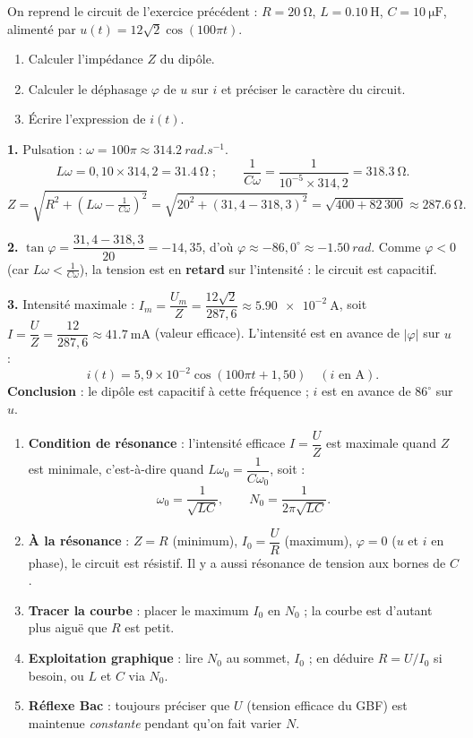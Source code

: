 \documentclass[11pt]{article}
\newcommand{\cle}[1]{{\popxbold\color{popdark}#1}}
\begin{document}
\begin{exoresolu}
On reprend le circuit de l'exercice précédent : $R = \SI{20}{\ohm}$, $L = \SI{0,10}{\henry}$, $C = \SI{10}{\micro\farad}$, alimenté par $u(t) = 12\sqrt{2}\cos(100\pi t)$.
\begin{enumerate}
\item Calculer l'impédance $Z$ du dipôle.
\item Calculer le déphasage $\varphi$ de $u$ sur $i$ et préciser le caractère du circuit.
\item Écrire l'expression de $i(t)$.
\end{enumerate}
\tcblower
\textbf{1.} Pulsation : $\omega = 100\pi \approx \SI{314,2}{rad.s^{-1}}$.
\[ L\omega = 0{,}10 \times 314{,}2 = \SI{31,4}{\ohm} \; ; \qquad \dfrac{1}{C\omega} = \dfrac{1}{10^{-5}\times 314{,}2} = \SI{318,3}{\ohm}. \]
\[ Z = \sqrt{R^2 + \left(L\omega - \tfrac{1}{C\omega}\right)^2} = \sqrt{20^2 + (31{,}4 - 318{,}3)^2} = \sqrt{400 + 82\,300} \approx \SI{287,6}{\ohm}. \]

\textbf{2.} $\tan\varphi = \dfrac{31{,}4 - 318{,}3}{20} = -14{,}35$, d'où $\varphi \approx -86{,}0^{\circ} \approx \SI{-1,50}{rad}$.
Comme $\varphi < 0$ (car $L\omega < \tfrac{1}{C\omega}$), la tension est en \textbf{retard} sur l'intensité : le circuit est \cle{capacitif}.

\textbf{3.} Intensité maximale : $I_m = \dfrac{U_m}{Z} = \dfrac{12\sqrt{2}}{287{,}6} \approx \SI{5,90e-2}{\ampere}$, soit $I = \dfrac{U}{Z} = \dfrac{12}{287{,}6} \approx \SI{41,7}{\milli\ampere}$ (valeur efficace).
L'intensité est en avance de $|\varphi|$ sur $u$ :
\[ i(t) = 5{,}9\times 10^{-2}\cos\left(100\pi t + 1{,}50\right) \quad (i \text{ en A}). \]
\textbf{Conclusion} : le dipôle est capacitif à cette fréquence ; $i$ est en avance de $86^{\circ}$ sur $u$.
\end{exoresolu}

\begin{methode}[Étudier la résonance d'intensité et exploiter la courbe $I = f(N)$]
\begin{enumerate}
\item \textbf{Condition de résonance} : l'intensité efficace $I = \dfrac{U}{Z}$ est maximale quand $Z$ est minimale, c'est-à-dire quand $L\omega_0 = \dfrac{1}{C\omega_0}$, soit :
\[ \omega_0 = \dfrac{1}{\sqrt{LC}}, \qquad N_0 = \dfrac{1}{2\pi\sqrt{LC}}. \]
\item \textbf{À la résonance} : $Z = R$ (minimum), $I_0 = \dfrac{U}{R}$ (maximum), $\varphi = 0$ ($u$ et $i$ en phase), le circuit est résistif. Il y a aussi résonance de tension aux bornes de $C$.
\item \textbf{Tracer la courbe} : placer le maximum $I_0$ en $N_0$ ; la courbe est d'autant plus aiguë que $R$ est petit.
\item \textbf{Exploitation graphique} : lire $N_0$ au sommet, $I_0$ ; en déduire $R = U/I_0$ si besoin, ou $L$ et $C$ via $N_0$.
\item \textbf{Réflexe Bac} : toujours préciser que $U$ (tension efficace du GBF) est maintenue \emph{constante} pendant qu'on fait varier $N$.
\end{enumerate}
\end{methode}
\end{document}
